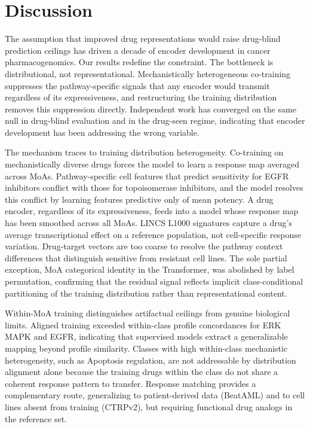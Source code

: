 \section*{Discussion}

The assumption that improved drug representations would raise drug-blind prediction ceilings has driven a decade of encoder development in cancer pharmacogenomics. Our results redefine the constraint. The bottleneck is distributional, not representational. Mechanistically heterogeneous co-training suppresses the pathway-specific signals that any encoder would transmit regardless of its expressiveness, and restructuring the training distribution removes this suppression directly. Independent work has converged on the same null in drug-blind evaluation\cite{herbert2026monotherapy,bernett2025dreval} and in the drug-seen regime\cite{carli2025cellhit}, indicating that encoder development has been addressing the wrong variable.

The mechanism traces to training distribution heterogeneity. Co-training on mechanistically diverse drugs forces the model to learn a response map averaged across MoAs. Pathway-specific cell features that predict sensitivity for EGFR inhibitors conflict with those for topoisomerase inhibitors, and the model resolves this conflict by learning features predictive only of mean potency. A drug encoder, regardless of its expressiveness, feeds into a model whose response map has been smoothed across all MoAs. LINCS L1000 signatures capture a drug's average transcriptional effect on a reference population, not cell-specific response variation. Drug-target vectors are too coarse to resolve the pathway context differences that distinguish sensitive from resistant cell lines. The sole partial exception, MoA categorical identity in the Transformer, was abolished by label permutation, confirming that the residual signal reflects implicit class-conditional partitioning of the training distribution rather than representational content.

Within-MoA training distinguishes artifactual ceilings from genuine biological limits. Aligned training exceeded within-class profile concordances for ERK MAPK and EGFR, indicating that supervised models extract a generalizable mapping beyond profile similarity. Classes with high within-class mechanistic heterogeneity, such as Apoptosis regulation, are not addressable by distribution alignment alone because the training drugs within the class do not share a coherent response pattern to transfer. Response matching provides a complementary route, generalizing to patient-derived data (BeatAML) and to cell lines absent from training (CTRPv2), but requiring functional drug analogs in the reference set.

